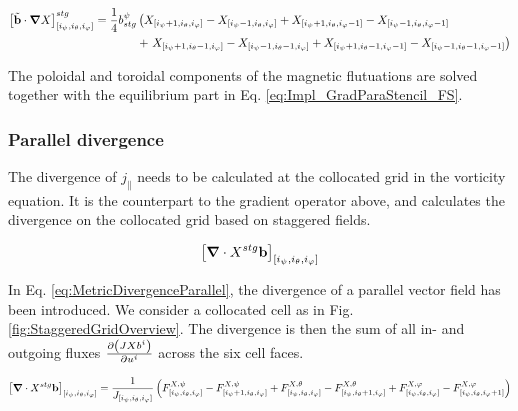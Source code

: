 \begin{align}
	\left[\tilde{\textbf{b}}\cdot\grad X \right]^{stg}_{[i_\psi,i_\theta, i_\varphi]} = \frac{1}{4}b^\psi_{stg}
	&\left( 
	  X_{[i_\psi+1,i_\theta, i_\varphi]} - X_{[i_\psi-1,i_\theta, i_\varphi]} 
	+  X_{[i_\psi+1,i_\theta, i_\varphi-1]} - X_{[i_\psi-1,i_\theta, i_\varphi-1]} \right. \nonumber \\ 
	&+ \left. X_{[i_\psi+1,i_\theta-1, i_\varphi]} - X_{[i_\psi-1,i_\theta-1, i_\varphi]} 
	+  X_{[i_\psi+1,i_\theta-1, i_\varphi-1]} - X_{[i_\psi-1,i_\theta-1, i_\varphi-1]}\right)
	\label{eq:Impl_GradParaStencil_flutter}
\end{align}



The poloidal and toroidal components of the magnetic flutuations are solved together with the equilibrium part in Eq. \ref{eq:Impl_GradParaStencil_FS}.


\subsubsection{Parallel divergence}

The divergence of $j_\parallel$ needs to be calculated at the collocated grid in the vorticity equation. It is the counterpart to the gradient operator above, and calculates the divergence on the collocated grid based on staggered fields. 

\begin{equation}
	\left[\grad\cdot X^{stg}\mathbf{b}\right]_{[i_\psi,i_\theta, i_\varphi]}
\end{equation}

In Eq. \ref{eq:MetricDivergenceParallel}, the divergence of a parallel vector field has been introduced. We consider a collocated cell as in Fig. \ref{fig:StaggeredGridOverview}. The divergence is then the sum of all in- and outgoing fluxes $\pdv{\left(J X b^i\right)}{u^i}$ across the six cell faces. 

\begin{equation}
	\label{eq:NumericalStaggeredDivergenceStencil}
	\left[\grad\cdot X^{stg}\mathbf{b}\right]_{[i_\psi,i_\theta, i_\varphi]} = \frac{1}{J_{[i_\psi,i_\theta, i_\varphi]}} \left(F_{[i_\psi,i_\theta, i_\varphi]}^{X,\psi}-F_{[i_\psi+1,i_\theta, i_\varphi]}^{X,\psi} + F_{[i_\psi,i_\theta, i_\varphi]}^{X,\theta}-F_{[i_\psi,i_\theta+1, i_\varphi]}^{X,\theta}+F_{[i_\psi,i_\theta, i_\varphi]}^{X,\varphi}-F_{[i_\psi,i_\theta, i_\varphi+1]}^{X,\varphi}\right)
\end{equation}

